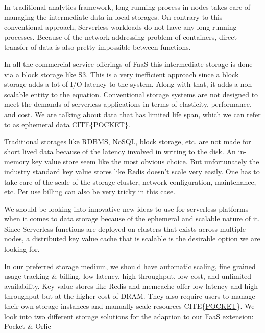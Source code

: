 \documentclass[12pt,titlepage]{article}
\begin{document}
In traditional analytics framework, long running process in nodes takes care of
managing the intermediate data in local storages. On contrary to this
conventional approach, Serverless workloads do not have any long running
processes. Because of the network addressing problem of containers, direct
transfer of data is also pretty impossible between functions.

In all the commercial service offerings of FaaS this intermediate storage is
done via a block storage like S3. This is a very inefficient approach since a
block storage adds a lot of I/O latency to the system. Along with that, it adds
a non scalable entity to the equation. Conventional storage systems are not
designed to meet the demands of serverless applications in terms of elasticity,
performance, and cost. We are talking about data that has limited life span,
which we can refer to as ephemeral data CITE\{\href{https://www.usenix.org/system/files/osdi18-klimovic.pdf}{POCKET}\}.

Traditional storages like RDBMS, NoSQL, block storage, etc. are not made for
short lived data because of the latency involved in writing to the disk. An
in-memory key value store seem like the most obvious choice. But unfortunately
the industry standard key value stores like Redis doesn't scale very easily. One
has to take care of the scale of the storage cluster, network configuration,
maintenance, etc. Per use billing can also be very tricky in this case.

We should be looking into innovative new ideas to use for serverless platforms when
it comes to data storage because of the ephemeral and scalable nature of it.
Since Serverless functions are deployed on clusters that exists across multiple
nodes, a distributed key value cache that is scalable is the desirable option we
are looking for.

In our preferred storage medium, we should have automatic scaling, fine grained
usage tracking \& billing, low latency, high throughput, low cost, and unlimited
availability. Key value stores like Redis and memcache offer low latency and
high throughput but at the higher cost of DRAM. They also require users to
manage their own storage instances and manually scale resources CITE\{\href{https://www.usenix.org/system/files/osdi18-klimovic.pdf}{POCKET}\}. We look into
two different storage solutions for the adaption to our FaaS extension: Pocket \& Orlic
\end{document}
